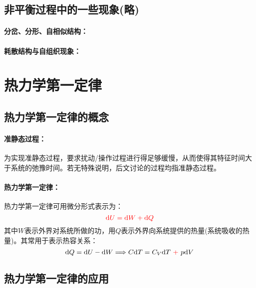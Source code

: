 \documentclass[zihao=-4,UTF8]{report}
\begin{document}
\section{非平衡过程中的一些现象(略)}
\subsubsection{分岔、分形、自相似结构：}
\subsubsection{耗散结构与自组织现象：}

\chapter{热力学第一定律}
\section{热力学第一定律的概念}
\subsubsection{准静态过程：}
为实现准静态过程，要求扰动/操作过程进行得足够缓慢，从而使得其特征时间大于系统的弛豫时间。若无特殊说明，后文讨论的过程均指准静态过程。
\subsubsection{热力学第一定律：}
热力学第一定律可用微分形式表示为：
\begin{equation}\color{red}
    \mathrm{d}U = \mathrm{d}W +\mathrm{d}Q
\end{equation}
其中$W$表示外界对系统所做的功，用$Q$表示外界向系统提供的热量(系统吸收的热量)。其常用于表示热容关系：
\begin{equation}
    \mathrm{d}Q = \mathrm{d}U - \mathrm{d}W \Longrightarrow C\mathrm{d}T = C_V\mathrm{d}T \ {\color{red}+}\ p   \mathrm{d}V
\end{equation}
\section{热力学第一定律的应用}
\end{document}
